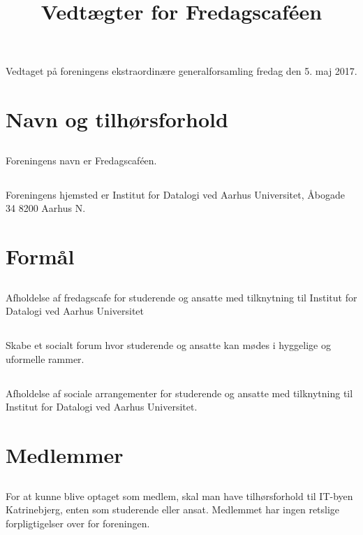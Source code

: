\documentclass[danish,a4paper,twocolumn,oneside,article]{memoir}
\title{Vedtægter for Fredagscaféen}
\author{}
\date{}
\begin{document}
\maketitle
\newpage

Vedtaget på foreningens ekstraordinære generalforsamling fredag den 5. maj 2017.

\chapter{Navn og tilhørsforhold}

\section{} Foreningens navn er Fredagscaféen.

\section{} Foreningens hjemsted er Institut for Datalogi ved Aarhus Universitet, Åbogade 34 8200 Aarhus N.

\chapter{Formål}

\section{} Afholdelse af fredagscafe for studerende og ansatte med tilknytning til Institut for Datalogi
ved Aarhus Universitet

\section{} Skabe et socialt forum hvor studerende og ansatte kan mødes i hyggelige og uformelle rammer.

\section{} Afholdelse af sociale arrangementer for studerende og ansatte med tilknytning til Institut for Datalogi
ved Aarhus Universitet.


\chapter{Medlemmer}

\section{} For at kunne blive optaget som medlem, skal man have tilhørsforhold til IT-byen Katrinebjerg,
enten som studerende eller ansat. Medlemmet har ingen retslige forpligtigelser over for foreningen.
\end{document}

